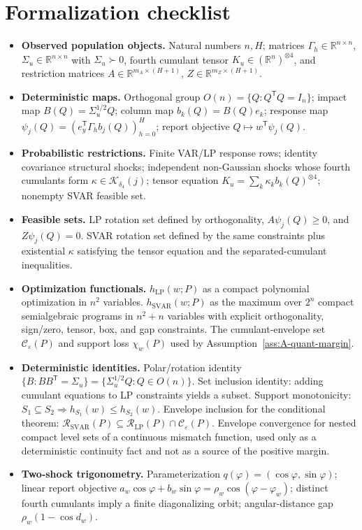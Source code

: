 \documentclass[11pt]{article}
\newcommand{\transpose}{\mathsf{T}}
\newcommand{\R}{\mathbb{R}}
\theoremstyle{definition}
\theoremstyle{plain}
\theoremstyle{remark}
\begin{document}
\section{Formalization checklist}
\begin{itemize}[leftmargin=*]
\item \textbf{Observed population objects.}  Natural numbers \(n,H\); matrices
\(\Gamma_h\in\R^{n\times n}\), \(\Sigma_u\in\R^{n\times n}\) with
\(\Sigma_u\succ0\), fourth cumulant tensor \(K_u\in(\R^n)^{\otimes4}\), and
restriction matrices \(A\in\R^{m_A\times(H+1)}\),
\(Z\in\R^{m_Z\times(H+1)}\).

\item \textbf{Deterministic maps.}  Orthogonal group
\(O(n)=\{Q:Q^\transpose Q=I_n\}\); impact map \(B(Q)=\Sigma_u^{1/2}Q\);
column map \(b_k(Q)=B(Q)e_k\); response map
\(\psi_j(Q)=(e_y^\transpose\Gamma_h b_j(Q))_{h=0}^H\); report objective
\(Q\mapsto w^\transpose\psi_j(Q)\).

\item \textbf{Probabilistic restrictions.}  Finite VAR/LP response rows;
identity covariance structural shocks; independent non-Gaussian shocks whose
fourth cumulants form \(\kappa\in\mathcal K_{\delta_4}(j)\); tensor equation
\(K_u=\sum_k\kappa_kb_k(Q)^{\otimes4}\); nonempty SVAR feasible set.

\item \textbf{Feasible sets.}  LP rotation set defined by orthogonality,
\(A\psi_j(Q)\ge0\), and \(Z\psi_j(Q)=0\).  SVAR rotation set defined by the
same constraints plus existential \(\kappa\) satisfying the tensor equation
and the separated-cumulant inequalities.

\item \textbf{Optimization functionals.}  \(h_{\mathrm{LP}}(w;P)\) as a compact
polynomial optimization in \(n^2\) variables.  \(h_{\mathrm{SVAR}}(w;P)\) as
the maximum over \(2^n\) compact semialgebraic programs in \(n^2+n\) variables
with explicit orthogonality, sign/zero, tensor, box, and gap constraints.
The cumulant-envelope set \(\mathcal C_\varepsilon(P)\) and support loss
\(\chi_w(P)\) used by Assumption~\ref{ass:A-quant-margin}.

\item \textbf{Deterministic identities.}  Polar/rotation identity
\(\{B:BB^\transpose=\Sigma_u\}=\{\Sigma_u^{1/2}Q:Q\in O(n)\}\).  Set inclusion
identity: adding cumulant equations to LP constraints yields a subset.
Support monotonicity: \(S_1\subseteq S_2\Rightarrow h_{S_1}(w)\le h_{S_2}(w)\).
Envelope inclusion for the conditional theorem:
\(\mathcal R_{\mathrm{SVAR}}(P)\subseteq
\mathcal R_{\mathrm{LP}}(P)\cap\mathcal C_\varepsilon(P)\).  Envelope
convergence for nested compact level sets of a continuous mismatch function,
used only as a deterministic continuity fact and not as a source of the
positive margin.

\item \textbf{Two-shock trigonometry.}  Parameterization
\(q(\varphi)=(\cos\varphi,\sin\varphi)\); linear report objective
\(a_w\cos\varphi+b_w\sin\varphi=\rho_w\cos(\varphi-\varphi_w)\); distinct
fourth cumulants imply a finite diagonalizing orbit; angular-distance gap
\(\rho_w(1-\cos d_w)\).
\end{itemize}
\end{document}
